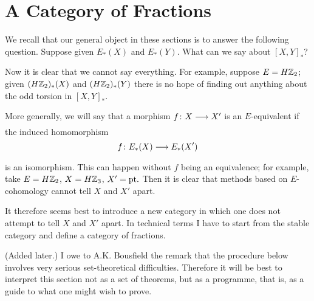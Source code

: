 \documentclass[../main]{subfiles}
\begin{document}

\chapter{A Category of Fractions}
\label{sec:p3c14}
We recall that our general object in these sections is to answer the following question. Suppose given  $E_{\ast}(X)$ and $E_{\ast}(Y)$. What can we say about $\left[ X,Y \right]_{\ast}$?

Now it is clear that we cannot say everything. For example, suppose $E = H\mathbb{Z}_{2}$; given $(H\mathbb{Z}_{2})_{\ast}(X)$ and $(H\mathbb{Z}_{2})_{\ast}(Y)$ there is no hope of finding out anything about the odd torsion in $\left[ X,Y \right]_{\ast}$. 

More generally, we will say that a morphism $f\colon X \lar{} X' $ is an $E$-equivalent if the induced homomorphism 
\[
  f\colon E_{\ast}(X) \lar{} E_{\ast}(X') 
\]
is an isomorphism. This can happen without $f$ being an equivalence; for example, take $E = H\mathbb{Z}_{2}$, $X = H\mathbb{Z}_3$, $X'= \mathrm{pt}.$ Then it is clear that methods based on $E$-cohomology cannot tell $X$ and $X'$ apart.

It therefore seems best to introduce a new category in which one does not attempt to tell $X$ and $X'$ apart. In technical terms I have to start from the stable category and define a category of fractions.

(Added later.) I owe to A.K. Bousfield the remark that the procedure below involves very serious set-theoretical difficulties. Therefore it will be best to interpret this section not as a set of theorems, but as a programme, that is, as a guide to what one might wish to prove.
\end{document}
